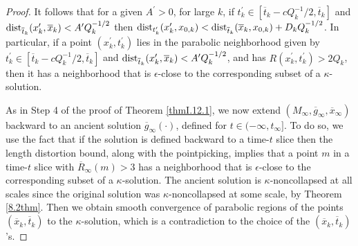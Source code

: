 \begin{proof}
It follows that for a given $A^\prime > 0$, for large
$k$, if $t_k^\prime \in [\overline{t}_k - c Q_k^{-1}/2, \overline{t}_k]$ and
$\operatorname{dist}_{\overline{t}_k}(x_k^\prime, \overline{x}_k) < A^\prime Q_k^{-1/2}$
then $\operatorname{dist}_{t^\prime_k}(x^\prime_k, {x}_{0,k})
< \operatorname{dist}_{\overline{t}_k}(\overline{x}_k,
x_{0,k}) +
D_k Q_k^{-1/2}$. In particular, if a point
$(x_k^\prime, t_k^\prime)$ lies in the
parabolic neighborhood given by
$t_k^\prime \in [\overline{t}_k - c Q_k^{-1}/2, \overline{t}_k]$ and
$\operatorname{dist}_{\overline{t}_k}(x_k^\prime, \overline{x}_k) < A^\prime Q_k^{-1/2}$,
and  has
$R(x_k^\prime, t_k^\prime) > 2Q_k$, then it has a neighborhood that
is $\epsilon$-close to the corresponding subset of a $\kappa$-solution.

As in Step 4 of the proof of Theorem \ref{thmI.12.1}, we now extend
$(M_\infty,
\overline{g}_\infty, \overline{x}_\infty)$ backward to an ancient solution
$\overline{g}_\infty(\cdot)$, defined for $t \in (-\infty, t_\infty]$.
To do so, we use the fact that if the solution
is defined backward to a time-$t$ slice then
the length distortion bound, along with the pointpicking,
implies that a point $m$ in a time-$t$ slice with $\overline{R}_\infty(m)
> 3$ has a neighborhood that is $\epsilon$-close to the corresponding
subset of a $\kappa$-solution. The ancient solution is $\kappa$-noncollapsed
at all scales since the original solution was $\kappa$-noncollapsed at
some scale, by Theorem \ref{8.2thm}.
Then we obtain smooth convergence
of parabolic regions of the points $(\overline{x}_k, \overline{t}_k)$ to
the $\kappa$-solution, which is a contradiction to the choice of the
$(\overline{x}_k, \overline{t}_k)$'s.
\end{proof}
